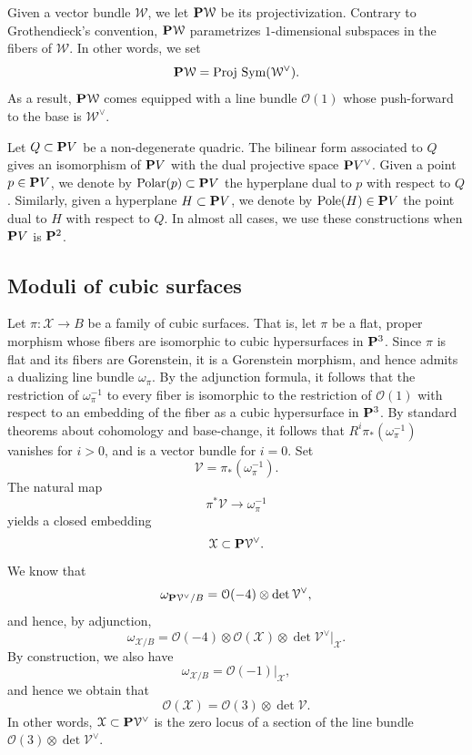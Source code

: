 \documentclass[12pt,reqno]{amsart}
\DeclareMathOperator{\Polar}{Polar}
\DeclareMathOperator{\Pole}{Pole}
\renewcommand{\to}{{\longrightarrow}}
\numberwithin{equation}{section}
\renewcommand{\O}{\mathcal O}
\newcommand{\cX}{\mathcal{X}}
\newcommand{\Proj}{{\text{\rm Proj}\,}}
\begin{document}
Given a vector bundle $\mathcal W$, we let $\P \mathcal W$ be its
projectivization.  Contrary to Grothendieck's convention,
$\P \mathcal W$ parametrizes $1$-dimensional subspaces in the fibers
of $\mathcal W$.  In other words, we set
\[ \P \mathcal W = \Proj \Sym(\mathcal W^\vee).\] As a result,
$\P \mathcal W$ comes equipped with a line bundle $\O(1)$ whose
push-forward to the base is $\mathcal W^\vee$.

Let $Q \subset \P V$ be a non-degenerate quadric.  The bilinear form
associated to $Q$ gives an isomorphism of $\P V$ with the dual
projective space $\P V^\vee$.  Given a point $p \in \P V$, we denote
by $\Polar(p) \subset \P V$ the hyperplane dual to $p$ with respect to
$Q$. Similarly, given a hyperplane $H \subset \P V$, we denote by
$\Pole(H) \in \P V$ the point dual to $H$ with respect to $Q$.  In
almost all cases, we use these constructions when $\P V$ is $\P^2$.

\subsection{Moduli of cubic surfaces}
\label{sec:classical-facts}
Let $\pi \colon \cX \to B$ be a family of cubic surfaces.  That is,
let $\pi$ be a flat, proper morphism whose fibers are isomorphic to
cubic hypersurfaces in $\P^3$.  Since $\pi$ is flat and its fibers are
Gorenstein, it is a Gorenstein morphism, and hence admits a dualizing
line bundle $\omega_\pi$.  By the adjunction formula, it follows that
the restriction of $\omega_{\pi}^{-1}$ to every fiber is isomorphic to
the restriction of $\O(1)$ with respect to an embedding of the fiber
as a cubic hypersurface in $\P^3$.  By standard theorems about
cohomology and base-change, it follows that
$R^i\pi_* \left(\omega_{\pi}^{-1}\right)$ vanishes for $i > 0$, and is
a vector bundle for $i = 0$.  Set
\[ \mathcal V = \pi_* \left( \omega_\pi^{-1} \right).\]
The natural map 
\[ \pi^*\mathcal V \to \omega_{\pi}^{-1}\]
yields a closed embedding
\begin{equation}\label{eqn:relcanx}
  \cX \subset \P \mathcal V^\vee.
\end{equation}
We know that
\[ \omega_{\P \mathcal V^\vee/B} = \O(-4) \otimes \det \mathcal V^\vee,\]
and hence, by adjunction,
\[ \omega_{\cX/B}= \O(-4) \otimes \O(\cX) \otimes \det \mathcal V^\vee |_\cX.\]
By construction, we also have
\[ \omega_{\cX/B} = \O(-1)|_\cX,\]
and hence we obtain that
\begin{equation}\label{eqn:ox}
  \O(\cX) = \O(3) \otimes \det \mathcal V.
\end{equation}
In other words, $\cX \subset \P \mathcal V^\vee$ is the zero locus of
a section of the line bundle $\O(3) \otimes \det \mathcal V^\vee$.
\end{document}
